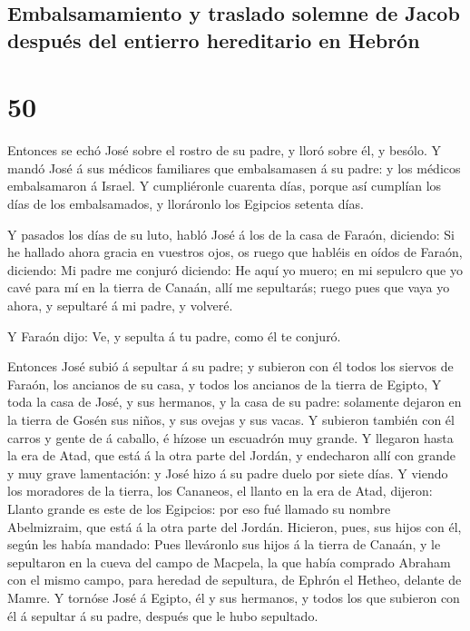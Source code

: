 \hypertarget{embalsamamiento-y-traslado-solemne-de-jacob-despuuxe9s-del-entierro-hereditario-en-hebruxf3n}{%
\subsection{Embalsamamiento y traslado solemne de Jacob después del
entierro hereditario en
Hebrón}\label{embalsamamiento-y-traslado-solemne-de-jacob-despuuxe9s-del-entierro-hereditario-en-hebruxf3n}}

\hypertarget{section-01-50}{%
\section{50}\label{section-01-50}}

 Entonces se echó José sobre el rostro de su padre, y
lloró sobre él, y besólo.  Y mandó José á sus médicos
familiares que embalsamasen á su padre: y los médicos embalsamaron á
Israel.  Y cumpliéronle cuarenta días, porque así cumplían
los días de los embalsamados, y lloráronlo los Egipcios setenta días.

 Y pasados los días de su luto, habló José á los de la
casa de Faraón, diciendo: Si he hallado ahora gracia en vuestros ojos,
os ruego que habléis en oídos de Faraón, diciendo:  Mi
padre me conjuró diciendo: He aquí yo muero; en mi sepulcro que yo cavé
para mí en la tierra de Canaán, allí me sepultarás; ruego pues que vaya
yo ahora, y sepultaré á mi padre, y volveré.

 Y Faraón dijo: Ve, y sepulta á tu padre, como él te
conjuró.

 Entonces José subió á sepultar á su padre; y subieron con
él todos los siervos de Faraón, los ancianos de su casa, y todos los
ancianos de la tierra de Egipto,  Y toda la casa de José,
y sus hermanos, y la casa de su padre: solamente dejaron en la tierra de
Gosén sus niños, y sus ovejas y sus vacas.  Y subieron
también con él carros y gente de á caballo, é hízose un escuadrón muy
grande.  Y llegaron hasta la era de Atad, que está á la
otra parte del Jordán, y endecharon allí con grande y muy grave
lamentación: y José hizo á su padre duelo por siete días.
 Y viendo los moradores de la tierra, los Cananeos, el
llanto en la era de Atad, dijeron: Llanto grande es este de los
Egipcios: por eso fué llamado su nombre Abelmizraim, que está á la otra
parte del Jordán.  Hicieron, pues, sus hijos con él,
según les había mandado:  Pues lleváronlo sus hijos á la
tierra de Canaán, y le sepultaron en la cueva del campo de Macpela, la
que había comprado Abraham con el mismo campo, para heredad de
sepultura, de Ephrón el Hetheo, delante de Mamre.  Y
tornóse José á Egipto, él y sus hermanos, y todos los que subieron con
él á sepultar á su padre, después que le hubo sepultado.

